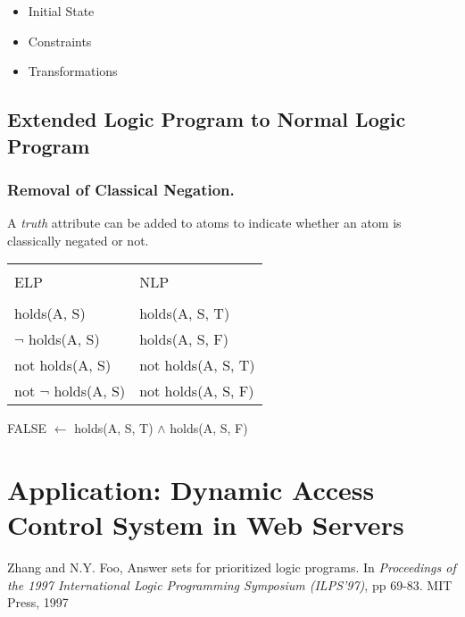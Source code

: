 \documentclass{llncs}
\begin{document}
        \begin{itemize}
          \item
            Initial State
          \item
            Constraints
          \item
            Transformations
        \end{itemize}

    \subsection{Extended Logic Program to Normal Logic Program}

      \subsubsection{Removal of Classical Negation.}
        A \emph{truth} attribute can be added to atoms to indicate whether
        an atom is classically negated or not.

        \vspace{0.65cm}

        \begin{table}
          \begin{tabular}{ll}
            \hline \\
            ELP & NLP \\
            \hline \\
            holds(A, S) & holds(A, S, T) \\
            $\lnot$ holds(A, S) & holds(A, S, F) \\
            not holds(A, S) & not holds(A, S, T) \\
            not $\lnot$ holds(A, S) & not holds(A, S, F) \\
            \hline
          \end{tabular}
        \end{table}

        FALSE $\leftarrow$ holds(A, S, T) $\land$ holds(A, S, F)

  \section{Application: Dynamic Access Control System in Web Servers}

  \begin{thebibliography}{5}

      Zhang and N.Y. Foo,
      Answer sets for prioritized logic programs.
      In {\em Proceedings of the 1997 International Logic Programming
      Symposium (ILPS'97)},
      pp 69-83. 
      MIT Press, 1997

  \end{thebibliography}
\end{document}
